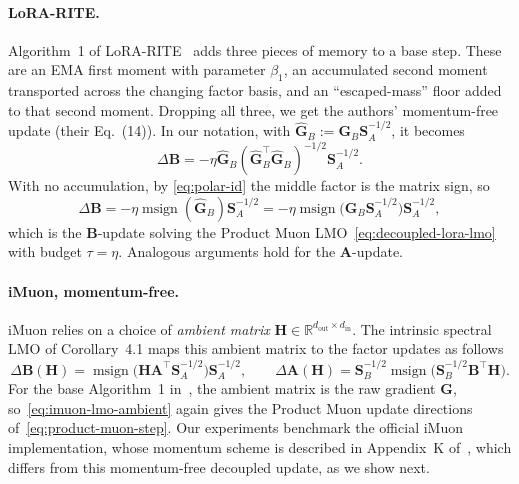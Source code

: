 \documentclass{article}
\newcommand{\mat}[1]{\bm{#1}}
\newcommand{\R}{\mathbb{R}}
\DeclareMathOperator{\msign}{msign}          %
\begin{document}
\paragraph{LoRA-RITE.}
Algorithm~1 of LoRA-RITE~\cite{lorarite} adds three pieces of memory to a base step. These are an EMA first moment with parameter $\beta_1$, an accumulated second moment transported across the changing factor basis, and an ``escaped-mass'' floor added to that second moment.
Dropping all three, we get the authors' momentum-free update (their Eq.~(14)).
In our notation, with $\widehat{\mat{G}}_B := \mat{G}_B \mat{S}_A^{-1/2}$, it becomes
\[
  \Delta\mat{B}=-\eta \widehat{\mat{G}}_B (\widehat{\mat{G}}_B^\top\widehat{\mat{G}}_B)^{-1/2} \mat{S}_A^{-1/2}.
\]
With no accumulation, by \eqref{eq:polar-id} the middle factor is the matrix sign, so
\begin{equation*}
  \Delta\mat{B}=-\eta \msign(\widehat{\mat{G}}_B) \mat{S}_A^{-1/2}
  =-\eta \msign \big(\mat{G}_B \mat{S}_A^{-1/2}\big) \mat{S}_A^{-1/2},
\end{equation*}
which is the $\mat{B}$-update solving the Product Muon LMO~\eqref{eq:decoupled-lora-lmo} with budget $\tau=\eta$. Analogous arguments hold for the $\mat{A}$-update.


\paragraph{iMuon, momentum-free.}
iMuon relies on a choice of \emph{ambient matrix} $\mat{H}\in\R^{d_{\mathrm{out}}\times d_{\mathrm{in}}}$. The intrinsic spectral LMO of Corollary~4.1 maps this ambient matrix to the factor updates as follows
\begin{equation}
  \Delta\mat{B}(\mat{H}) =\msign \big(\mat{H}\mat{A}^\top \mat{S}_A^{-1/2}\big)\mat{S}_A^{-1/2},\qquad
  \Delta\mat{A}(\mat{H}) =\mat{S}_B^{-1/2}\msign \big(\mat{S}_B^{-1/2}\mat{B}^\top \mat{H}\big).
  \label{eq:imuon-lmo-ambient}
\end{equation}
For the base Algorithm~1 in~\cite{imuon}, the ambient matrix is the raw gradient $\mat{G}$, so~\eqref{eq:imuon-lmo-ambient}
again gives the Product Muon update directions of~\eqref{eq:product-muon-step}. Our experiments benchmark the official iMuon implementation, whose momentum scheme is described in Appendix~K of~\cite{imuon}, which differs from this momentum-free decoupled update, as we show next.
\end{document}
